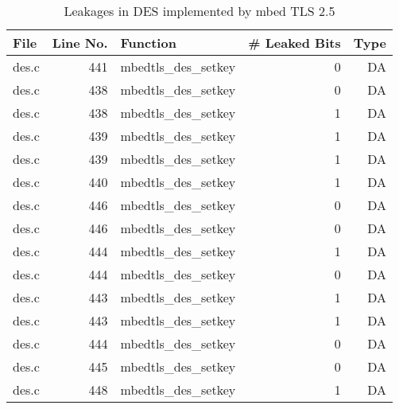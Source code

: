 \begin{table}[h!]
\centering\tiny\scriptsize
\caption{Leakages in DES implemented by mbed TLS 2.5}\label{tab:DESmbed TLS2.5}
\begin{tabular}{lrlrr}
\hline
\textbf{File} & \textbf{Line No.} & \textbf{Function} & \textbf{\# Leaked Bits} & \textbf{Type} \\\hline
des.c& 441&mbedtls\_des\_setkey&0 &DA\\
des.c& 438&mbedtls\_des\_setkey&0 &DA\\
des.c& 438&mbedtls\_des\_setkey&1 &DA\\
des.c& 439&mbedtls\_des\_setkey&1 &DA\\
des.c& 439&mbedtls\_des\_setkey&1 &DA\\
des.c& 440&mbedtls\_des\_setkey&1 &DA\\
des.c& 446&mbedtls\_des\_setkey&0 &DA\\
des.c& 446&mbedtls\_des\_setkey&0 &DA\\
des.c& 444&mbedtls\_des\_setkey&1 &DA\\
des.c& 444&mbedtls\_des\_setkey&0 &DA\\
des.c& 443&mbedtls\_des\_setkey&1 &DA\\
des.c& 443&mbedtls\_des\_setkey&1 &DA\\
des.c& 444&mbedtls\_des\_setkey&0 &DA\\
des.c& 445&mbedtls\_des\_setkey&0 &DA\\
des.c& 448&mbedtls\_des\_setkey&1 &DA\\
\hline
\end{tabular}
\renewcommand{\baselinestretch}{1.0}\selectfont
\end{table}
